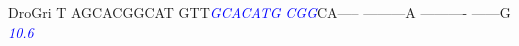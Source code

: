 \documentclass[11pt,twoside,reqno,a4paper]{article}
\begin{document}
{DroGri	T	AGCACGGCAT	GTT\textit{\textcolor{Blue}{G}}\textit{\textcolor{Blue}{C}}\textit{\textcolor{Blue}{A}}\textit{\textcolor{Blue}{C}}\textit{\textcolor{Blue}{A}}\textit{\textcolor{Blue}{T}}\textit{\textcolor{Blue}{G}}	\textit{\textcolor{Blue}{C}}\textit{\textcolor{Blue}{G}}\textit{\textcolor{Blue}{G}}CA-----	---------A	----------	------G\\
\hspace*{7\charwidth}\hspace*{1\charwidth}\hspace*{1\charwidth}\hspace*{14\charwidth}\textit{\textcolor{Blue}{10.6}}\hspace*{1\charwidth}\hspace*{1\charwidth}\hspace*{1\charwidth}\hspace*{1\charwidth}\\
\\
}
\end{document}

